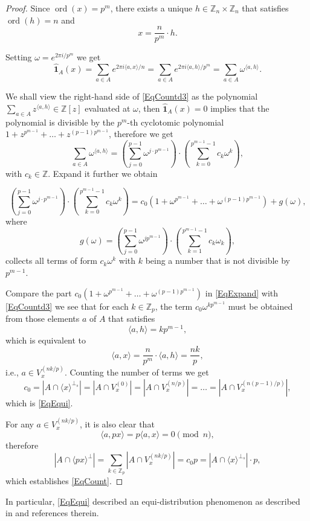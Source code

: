 \documentclass[A4, 11pt]{article}
\DeclareMathOperator{\ord}{ord}
\newcommand{\bra}[1]{\langle#1\rangle}
\newcommand{\G}[1]{\mathbb Z_{#1}\times\mathbb Z_{#1}}
\newcommand{\F}[1]{\widehat{\mathbf 1}_{#1}}
\begin{document}
\begin{proof}
Since $\ord(x)=p^m$, there exists a unique $h\in\G{n}$ that satisfies $\ord(h)=n$ and 
$$x=\frac{n}{p^m}\cdot h.$$

Setting $\omega=e^{2\pi i/p^m}$ we get
\begin{equation}  \label{EqCountd3}
\F{A}(x)=\sum_{a\in A}e^{2\pi i\bra{a,x}/n}=\sum_{a\in A}e^{2\pi i\bra{a,h}/p^m}=\sum_{a\in A}\omega^{\bra{a,h}}.
\end{equation}

We shall view the right-hand side of \eqref{EqCountd3} as the polynomial $\sum_{a\in A}z^{\bra{a,h}}\in\mathbb Z[z]$ evaluated at $\omega$, then $\F{A}(x)=0$ implies that the polynomial is divisible by the $p^m$-th cyclotomic polynomial $1+z^{p^{m-1}}+\ldots+z^{(p-1)p^{m-1}}$, therefore we get 
$$\sum_{a\in A}\omega^{\bra{a,h}}=\left(\sum_{j=0}^{p-1}\omega^{j\cdot p^{m-1}}\right) \cdot \left(\sum_{k=0}^{p^{m-1}-1}c_k\omega^k\right),$$
with $c_k\in\mathbb Z$. Expand it further we obtain

\begin{equation} \label{EqExpand}
\left(\sum_{j=0}^{p-1}\omega^{j\cdot p^{m-1}}\right) \cdot \left(\sum_{k=0}^{p^{m-1}-1}c_k\omega^k\right)=c_0(1+\omega^{p^{m-1}}+\ldots+\omega^{(p-1)p^{m-1}})+g(\omega),
\end{equation}
where
$$g(\omega)=\left(\sum_{j=0}^{p-1}\omega^{jp^{m-1}}\right) \cdot \left(\sum_{k=1}^{p^{m-1}-1}c_k\omega_k\right),$$
collects all terms of form $c_k\omega^k$ with $k$ being a number that is not divisible by $p^{m-1}$. 

Compare the part $c_0(1+\omega^{p^{m-1}}+\ldots+\omega^{(p-1)p^{m-1}})$ in \eqref{EqExpand} with \eqref{EqCountd3} we see that for each $k\in\mathbb Z_p$, the term $ c_0\omega^{kp^{m-1}}$ must be obtained from those elements $a$ of $A$ that satisfies
$$\bra{a,h}=kp^{m-1},$$
which is equivalent to
$$\bra{a,x}=\frac{n}{p^m}\cdot\bra{a,h}=\frac{nk}{p},$$
i.e., $a\in V_x^{(nk/p)}$. 
Counting the number of terms we get 
$$c_0=|A\cap\bra{x}^{\perp_s}|=|A\cap V_{x}^{(0)}|=|A\cap V_{x}^{(n/p)}|=\ldots=|A\cap V_{x}^{(n(p-1)/p)}|,$$
which is \eqref{EqEqui}. 

For any $a\in V_x^{(nk/p)}$, it is also clear that 
$$\bra{a,px}=p\bra{a,x}=0\pmod n,$$
therefore
$$|A\cap\bra{px}^{\perp}|=\sum_{k\in\mathbb Z_p}|A\cap V_{x}^{(nk/p)}|=c_0p=|A\cap\bra{x}^{\perp_s}|\cdot p,$$
which establishes \eqref{EqCount}. 
\end{proof}

In particular, \eqref{EqEqui} described an equi-distribution phenomenon as described in \cite{shi2020} and references therein.
\end{document}
